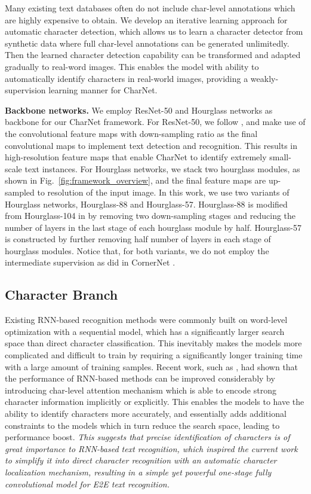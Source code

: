 \documentclass[10pt,twocolumn,letterpaper]{article}
\begin{document}
Many existing text databases often do not include char-level annotations which are highly expensive to obtain. We develop an iterative learning approach for automatic character detection, which allows us to learn a character detector from synthetic data where full char-level annotations can be generated unlimitedly. Then the learned character detection capability can be transformed and adapted gradually to real-word images. This enables the model with ability to automatically identify characters in real-world images, providing a weakly-supervision learning manner for CharNet.



\textbf{Backbone networks.}
We employ ResNet-50 \cite{he2016deep} and Hourglass \cite{law2018cornernet} networks as backbone for our CharNet framework. For ResNet-50, we follow \cite{zhou2017east}, and make use of the convolutional feature maps with  down-sampling ratio as the final convolutional maps to implement text detection and recognition. This results in high-resolution feature maps that enable CharNet to identify extremely small-scale text instances. For Hourglass networks, we stack two hourglass modules, as shown in Fig.~\ref{fig:framework_overview}, and the final feature maps are up-sampled to  resolution of the input image.  In this work, we use two variants of Hourglass networks, Hourglass-88 and Hourglass-57. Hourglass-88 is modified from Hourglass-104 in \cite{law2018cornernet} by removing two down-sampling stages and reducing the number of layers in the last stage of each hourglass module by half. Hourglass-57 is constructed by further removing half number of layers in each stage of hourglass modules. Notice that, for both variants, we do not employ the intermediate supervision as did in CornerNet \cite{law2018cornernet}.



\subsection{Character Branch}
Existing RNN-based recognition methods were commonly built on word-level optimization with a sequential model, which has a significantly larger search space than direct character classification. This inevitably makes the models more complicated and difficult to train by requiring a significantly longer training time with a large amount of training samples.
Recent work, such as \cite{shi2018aster, cheng2017iccv, he2018end}, had shown that the performance of RNN-based methods can be improved considerably by introducing char-level attention mechanism which is able to encode strong character information implicitly or explicitly. This enables the models to have the ability to identify characters more accurately,
and essentially adds additional constraints to the models which in turn reduce the search space, leading to performance boost.
\emph{This suggests that precise identification of characters is of great importance to RNN-based text recognition, which inspired the current work to simplify it into direct character recognition with an automatic character localization mechanism, resulting in a simple yet powerful one-stage fully convolutional model for E2E text recognition.}
\end{document}

